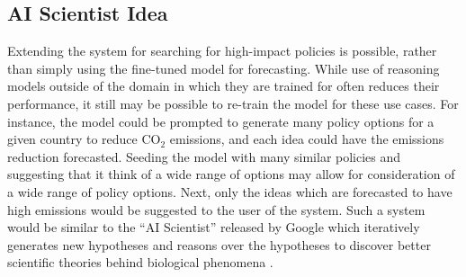 \documentclass[12pt,a4paper]{article}
\begin{document}
\subsection{AI Scientist Idea}
Extending the system for searching for high-impact policies is possible, rather than simply using the fine-tuned model for forecasting. While use of reasoning models outside of the domain in which they are trained for often reduces their performance, it still may be possible to re-train the model for these use cases. For instance, the model could be prompted to generate many policy options for a given country to reduce CO$_2$ emissions, and each idea could have the emissions reduction forecasted. Seeding the model with many similar policies and suggesting that it think of a wide range of options may allow for consideration of a wide range of policy options. Next, only the ideas which are forecasted to have high emissions would be suggested to the user of the system. Such a system would be similar to the ``AI Scientist'' released by Google which iteratively generates new hypotheses and reasons over the hypotheses to discover better scientific theories behind biological phenomena .
\end{document}
